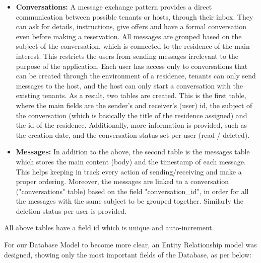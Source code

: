 \documentclass[12pt]{article}
\begin{document}
\begin{itemize}
		\item \textbf{Conversations:} A message exchange pattern provides a direct communication between possible tenants or hosts, through their inbox. They can ask for details, instructions, give offers and have a formal conversation even before making a reservation. All messages are grouped based on the subject of the conversation, which is connected to the residence of the main interest. This restricts the users from sending messages irrelevant to the purpose of the application. Each user has access only to conversations that can be created through the environment of a residence, tenants can only send messages to the host, and the host can only start a conversation with the existing tenants. As a result, two tables are created. This is the first table, where the main fields are the sender's and receiver's (user) id, the subject of the conversation (which is basically the title of the residence assigned) and the id of the residence. Additionally, more information is provided, such as the creation date, and the conversation status set per user (read / deleted).
		\item\textbf{Messages:} In addition to the above, the second table is the messages table which stores the main content (body) and the timestamp of each message. This helps keeping in track every action of sending/receiving and make a proper ordering. Moreover, the messages are linked to a conversation ("conversations" table) based on the field "conversation\_id", in order for all the messages with the same subject to be grouped together. Similarly the deletion status per user is provided.
	\end{itemize}
	All above tables have a field id which is unique and auto-increment. 
	
	For our Database Model to become more clear, an Entity Relationship model was designed, showing only the most important fields of the Database, as per below:
	
\end{document}
